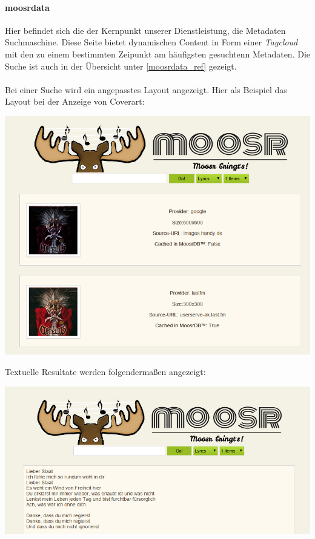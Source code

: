 \paragraph{moosrdata}
Hier befindet sich die der Kernpunkt unserer Dienstleistung, die Metadaten
Suchmaschine. Diese Seite bietet dynamischen Content in Form einer
\emph{Tagcloud} mit den zu einem bestimmten Zeipunkt am häufigsten gesuchtenn
Metadaten. Die Suche ist auch in der Übersicht unter \ref{moosrdata_ref}
gezeigt.
\\
\\
Bei einer Suche wird ein angepasstes Layout angezeigt. 
Hier als Beispiel das Layout bei der Anzeige von Coverart:

\begin{center}
\includegraphics[width=\textwidth]{../screenshots/moosrdata_cover_results.png}
\end{center}

Textuelle Resultate werden folgendermaßen angezeigt:
\begin{center}
\includegraphics[width=\textwidth]{../screenshots/moosrdata_lyrics_results.png}
\end{center}


